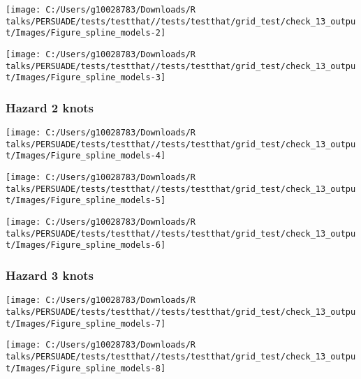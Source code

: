 \documentclass[
]{article}
\begin{document}
\begin{flushleft}\texttt{[image: C:/Users/g10028783/Downloads/R talks/PERSUADE/tests/testthat//tests/testthat/grid\_test/check\_13\_output/Images/Figure\_spline\_models-2]} \end{flushleft}

\begin{flushleft}\texttt{[image: C:/Users/g10028783/Downloads/R talks/PERSUADE/tests/testthat//tests/testthat/grid\_test/check\_13\_output/Images/Figure\_spline\_models-3]} \end{flushleft}

\clearpage

\subsubsection{Hazard 2 knots}\label{hazard-2-knots}

\begin{flushleft}\texttt{[image: C:/Users/g10028783/Downloads/R talks/PERSUADE/tests/testthat//tests/testthat/grid\_test/check\_13\_output/Images/Figure\_spline\_models-4]} \end{flushleft}

\begin{flushleft}\texttt{[image: C:/Users/g10028783/Downloads/R talks/PERSUADE/tests/testthat//tests/testthat/grid\_test/check\_13\_output/Images/Figure\_spline\_models-5]} \end{flushleft}

\begin{flushleft}\texttt{[image: C:/Users/g10028783/Downloads/R talks/PERSUADE/tests/testthat//tests/testthat/grid\_test/check\_13\_output/Images/Figure\_spline\_models-6]} \end{flushleft}

\clearpage

\subsubsection{Hazard 3 knots}\label{hazard-3-knots}

\begin{flushleft}\texttt{[image: C:/Users/g10028783/Downloads/R talks/PERSUADE/tests/testthat//tests/testthat/grid\_test/check\_13\_output/Images/Figure\_spline\_models-7]} \end{flushleft}

\begin{flushleft}\texttt{[image: C:/Users/g10028783/Downloads/R talks/PERSUADE/tests/testthat//tests/testthat/grid\_test/check\_13\_output/Images/Figure\_spline\_models-8]} \end{flushleft}
\end{document}

